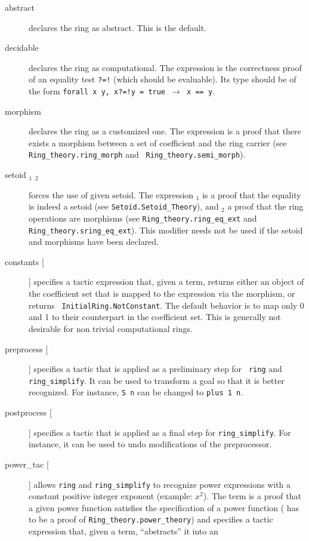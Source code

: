 \begin{description}
\item[abstract] declares the ring as abstract. This is the default.
\item[decidable \term] declares the ring as computational. The expression 
  \term{} is
  the correctness proof of an equality test {\tt ?=!} (which should be
  evaluable). Its type should be of
  the form {\tt forall x y, x?=!y = true $\rightarrow$ x == y}.
\item[morphism \term] declares the ring as a customized one. The expression 
  \term{} is
  a proof that there exists a morphism between a set of coefficient
  and the ring carrier (see {\tt Ring\_theory.ring\_morph} and {\tt
  Ring\_theory.semi\_morph}).
\item[setoid \term$_1$ \term$_2$] forces the use of given setoid. The 
  expression \term$_1$ is a proof that the equality is indeed a setoid
  (see {\tt Setoid.Setoid\_Theory}), and \term$_2$ a proof that the
  ring operations are morphisms (see {\tt Ring\_theory.ring\_eq\_ext} and
  {\tt Ring\_theory.sring\_eq\_ext}). This modifier needs not be used if the
  setoid and morphisms have been declared.
\item[constants [\ltac]] specifies a tactic expression that, given a term,
  returns either an object of the coefficient set that is mapped to
  the expression via the morphism, or returns {\tt
  InitialRing.NotConstant}. The default behavior is to map only 0 and
  1 to their counterpart in the coefficient set. This is generally not
  desirable for non trivial computational rings.
\item[preprocess [\ltac]]
  specifies a tactic that is applied as a preliminary step for {\tt
  ring} and {\tt ring\_simplify}. It can be used to transform a goal
  so that it is better recognized. For instance, {\tt S n} can be
  changed to {\tt plus 1 n}.
\item[postprocess [\ltac]] specifies a tactic that is applied as a final step
  for {\tt ring\_simplify}. For instance, it can be used to undo
  modifications of the preprocessor.
\item[power\_tac {\term} [\ltac]] allows {\tt ring} and {\tt ring\_simplify} to
  recognize power expressions with a constant positive integer exponent 
  (example: $x^2$). The term {\term} is a proof that a given power function
  satisfies the specification of a power function ({\term} has to be a
  proof of {\tt Ring\_theory.power\_theory}) and {\ltac} specifies a
  tactic expression that, given a term, ``abstracts'' it into an

\end{description}
